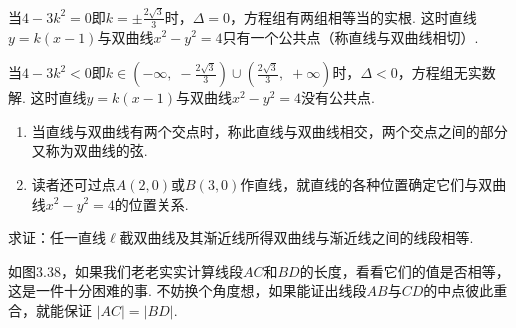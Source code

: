 \begin{solution}
当$4-3k^2=0$即$k=\pm\frac{2\sqrt{3}}{3}$时，$\Delta=0$，方程组有两组相等当的实根. 这时直线$y=k(x-1)$与双曲线$x^2-y^2=4$只有一个公共点（称直线与双曲线相切）.

当$4-3k^2<0$即$k\in\left(-\infty,\; -\frac{2\sqrt{3}}{3}\right)\cup\left(\frac{2\sqrt{3}}{3},\;+\infty\right)$时，$\Delta<0$，方程组无实数解. 这时直线$y=k(x-1)$与双曲线$x^2-y^2=4$没有公共点.
\end{solution}

\begin{remark}
\begin{enumerate}[(1)]
    \item 当直线与双曲线有两个交点时，称此直线与双曲线相交，两个交点之间的部分又称为双曲线的弦.
    \item 读者还可过点$A(2,0)$或$B(3,0)$作直线，就直线的各种位置确定它们与双曲线$x^2-y^2=4$的位置关系.
\end{enumerate}
\end{remark}

\begin{example}
求证：任一直线$\ell$截双曲线及其渐近线所得双曲线与渐近线之间的线段相等.
\end{example}

\begin{analyze}
如图3.38，如果我们老老实实计算线段$AC$和$BD$的长度，看看它们的值是否相等，这是一件十分困难的事. 不妨换个角度想，如果能证出线段$AB$与$CD$的中点彼此重合，就能保证
$|AC|=|BD|$.
\end{analyze}

